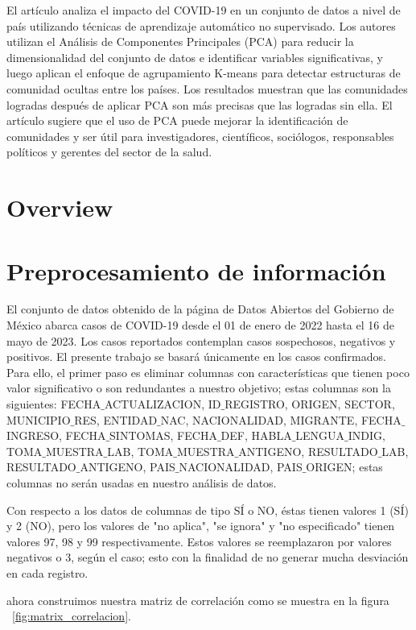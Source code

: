 \documentclass[a4paper,
               ]{jacow}
\begin{document}
El artículo \cite{Chaudhary2021} analiza el impacto del COVID-19 en un conjunto de datos a nivel de país utilizando técnicas de aprendizaje automático no supervisado. Los autores utilizan el Análisis de Componentes Principales (PCA) para reducir la dimensionalidad del conjunto de datos e identificar variables significativas, y luego aplican el enfoque de agrupamiento K-means para detectar estructuras de comunidad ocultas entre los países. Los resultados muestran que las comunidades logradas después de aplicar PCA son más precisas que las logradas sin ella. El artículo sugiere que el uso de PCA puede mejorar la identificación de comunidades y ser útil para investigadores, científicos, sociólogos, responsables políticos y gerentes del sector de la salud.

\section{Overview}

\section{Preprocesamiento de información}
El conjunto de datos obtenido de la página de Datos Abiertos del Gobierno de México abarca casos de COVID-19 desde el 01 de enero de 2022 hasta el 16 de mayo de 2023. Los casos reportados contemplan casos sospechosos, negativos y positivos. El presente trabajo se basará únicamente en los casos confirmados. Para ello, el primer paso es eliminar columnas con características que tienen poco valor significativo o son redundantes a nuestro objetivo; estas columnas son la siguientes: FECHA$\_$ACTUALIZACION, ID$\_$REGISTRO, ORIGEN, SECTOR, MUNICIPIO$\_$RES, ENTIDAD$\_$NAC, NACIONALIDAD, MIGRANTE, FECHA$\_$INGRESO, FECHA$\_$SINTOMAS, FECHA$\_$DEF, HABLA$\_$LENGUA$\_$INDIG, TOMA$\_$MUESTRA$\_$LAB, TOMA$\_$MUESTRA$\_$ANTIGENO, RESULTADO$\_$LAB, RESULTADO$\_$ANTIGENO, PAIS$\_$NACIONALIDAD, PAIS$\_$ORIGEN; estas columnas no serán usadas en nuestro análisis de datos. 

Con respecto a los datos de columnas de tipo SÍ o NO, éstas tienen valores 1 (SÍ)  y 2 (NO), pero los valores de "no aplica", "se ignora" y "no especificado" tienen valores 97, 98 y 99 respectivamente. Estos valores se reemplazaron por valores negativos o 3, según el caso; esto con la finalidad de no generar mucha desviación en cada registro. 

ahora construimos nuestra matriz de correlación como se muestra en la figura  ~\ref{fig:matrix_correlacion}.
\end{document}

